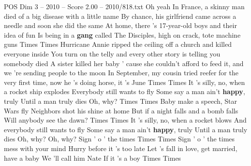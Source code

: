 \begin{textsample}{POS Dim 3 – 2010 – Score 2.00 – 2010/818.txt}  \label{ex:f3_pos_024}
Oh yeah In France, a skinny man died of a big disease with a little name By chance, his girlfriend came across a needle and soon she did the same At home, there 's 17-year-old boys and their idea of fun Is being in a \textbf{gang} called The Disciples, high on crack, tote machine guns Times Times Hurricane Annie ripped the ceiling off a church and killed everyone inside You turn on the telly and every other story is telling you somebody died A sister killed her baby ' cause she couldn't afford to feed it, and we 're sending people to the moon In September, my cousin tried reefer for the very first time, now he 's doing horse, it 's June Times Times It 's silly, no, when a rocket ship explodes Everybody still wants to fly Some say a man ain't \textbf{happy}, truly Until a man truly dies Oh, why?
Times Times Baby make a speech, Star Wars fly Neighbors shot his shine at home But if a night falls and a bomb falls Will anybody see the dawn?
Times Times It 's silly, no, when a rocket blows And everybody still wants to fly Some say a man ain't \textbf{happy}, truly Until a man truly dies Oh, why?
Oh, why?
Sign ' o ' the times Times Times Sign ' o ' the times mess with your mind Hurry before it 's too late Let 's fall in love, get married, have a baby We 'll call him Nate If it 's a boy Times Times

\end{textsample}
